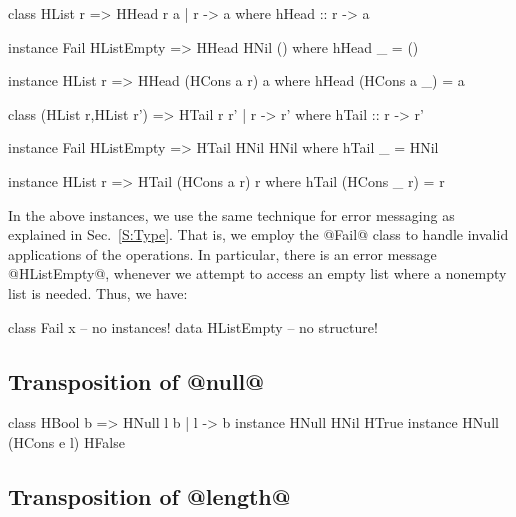 \documentclass[nocopyrightspace,preprint]{sigplan-proc}
\begin{document}
\begin{code}
 class  HList r => HHead r a | r -> a
  where hHead :: r -> a
\end{code}

\begin{code}
 instance Fail HListEmpty => HHead HNil ()
  where hHead _ = ()
\end{code}

\begin{code}
 instance HList r => HHead (HCons a r) a
  where hHead (HCons a _) = a
\end{code}
 
\begin{code}
 class (HList r,HList r') => HTail r r' | r -> r'
  where hTail :: r -> r'
\end{code}

\begin{code}
 instance Fail HListEmpty => HTail HNil HNil
  where hTail _ = HNil
\end{code}

\begin{code}
 instance HList r => HTail (HCons a r) r
  where hTail (HCons _ r) = r
\end{code}

In the above instances, we use the same technique for error messaging
as explained in Sec.~\ref{S:Type}. That is, we employ the @Fail@ class
to handle invalid applications of the operations. In particular, there
is an error message @HListEmpty@, whenever we attempt to access an
empty list where a nonempty list is needed. Thus, we have:

\begin{code}
 class Fail x      -- no instances!
 data HListEmpty   -- no structure!
\end{code}

\medskip

\subsection*{Transposition of @null@}

\begin{code}
 class HBool b => HNull l b | l -> b
 instance HNull HNil HTrue
 instance HNull (HCons e l) HFalse
\end{code}

\medskip

\subsection*{Transposition of @length@}
\end{document}
